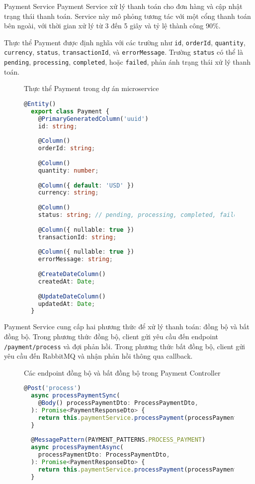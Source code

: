 Payment Service
Payment Service xử lý thanh toán cho đơn hàng và cập nhật trạng thái thanh toán. Service này mô phỏng tương tác với một cổng thanh toán bên ngoài, với thời gian xử lý từ 3 đến 5 giây và tỷ lệ thành công 90\%.

Thực thể Payment được định nghĩa với các trường như \texttt{id}, \texttt{orderId}, \texttt{quantity}, \texttt{currency}, \texttt{status}, \texttt{transactionId}, và \texttt{errorMessage}. Trường \texttt{status} có thể là \texttt{pending}, \texttt{processing}, \texttt{completed}, hoặc \texttt{failed}, phản ánh trạng thái xử lý thanh toán.

\begin{figure}[H]{Thực thể Payment trong dự án microservice}
  \centering
  \begin{minipage}{\textwidth}
    \begin{lstlisting}[language=Typescript, basicstyle=\scriptsize\ttfamily]
  @Entity()
  export class Payment {
    @PrimaryGeneratedColumn('uuid')
    id: string;
  
    @Column()
    orderId: string;
  
    @Column()
    quantity: number;
  
    @Column({ default: 'USD' })
    currency: string;
  
    @Column()
    status: string; // pending, processing, completed, failed
  
    @Column({ nullable: true })
    transactionId: string;
  
    @Column({ nullable: true })
    errorMessage: string;
  
    @CreateDateColumn()
    createdAt: Date;
  
    @UpdateDateColumn()
    updatedAt: Date;
  }
  \end{lstlisting}
  \end{minipage}
\end{figure}

Payment Service cung cấp hai phương thức để xử lý thanh toán: đồng bộ và bất đồng bộ. Trong phương thức đồng bộ, client gửi yêu cầu đến endpoint \texttt{/payment/process} và đợi phản hồi. Trong phương thức bất đồng bộ, client gửi yêu cầu đến RabbitMQ và nhận phản hồi thông qua callback.

\begin{figure}[H]{Các endpoint đồng bộ và bất đồng bộ trong Payment Controller}
  \centering
  \begin{minipage}{\textwidth}
    \begin{lstlisting}[language=Typescript, basicstyle=\scriptsize\ttfamily]
  @Post('process')
  async processPaymentSync(
    @Body() processPaymentDto: ProcessPaymentDto,
  ): Promise<PaymentResponseDto> {
    return this.paymentService.processPayment(processPaymentDto, true);
  }
  
  @MessagePattern(PAYMENT_PATTERNS.PROCESS_PAYMENT)
  async processPaymentAsync(
    processPaymentDto: ProcessPaymentDto,
  ): Promise<PaymentResponseDto> {
    return this.paymentService.processPayment(processPaymentDto, false);
  }
  \end{lstlisting}
  \end{minipage}
\end{figure}

